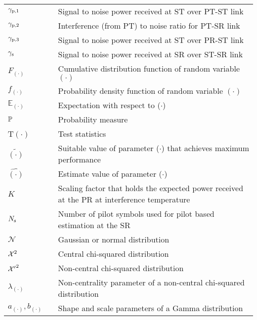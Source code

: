 \begin{longtable}{p{}p{}p{}}
	${\gamma}_{\text{p,1}}$  		& &		Signal to noise power received at ST over PT-ST link \\ 
        ${\gamma}_{\text{p,2}}$                & &             Interference (from PT) to noise ratio for PT-SR link \\
	${\gamma}_{\text{p,3}}$  		& &		Signal to noise power received at ST over PR-ST link \\ 
	${\gamma}_{\text{s}}$  		& &		Signal to noise power received at SR over ST-SR link \\ 
       $F_{(\cdot)}$            & &          Cumulative distribution function of random variable $(\cdot)$ \\
       $f_{(\cdot)}$            & &          Probability density function of random variable $(\cdot)$ \\
       $\mathbb E_{(\cdot)}$    & &		Expectation with respect to ($\cdot$) \\
       $\mathbb P$                     & &     	Probability measure \\
       T$(\cdot)$  	        & &          Test statistics \\
       $\tilde{(\cdot)}$        & &		Suitable value of parameter ($\cdot$) that achieves maximum performance \\
       $\hat{(\cdot)}$        & &		Estimate value of parameter ($\cdot$) \\
       $K$                      & &      Scaling factor that holds the expected power received at the PR at interference temperature  \\
       $N_{\text{s}}$                    & &      Number of pilot symbols used for pilot based estimation at the SR \\
       $\mathcal N$                & &      Gaussian or normal distribution\\
       $\cchi2 $                & &      Central chi-squared distribution \\
       $\ncchi2$                & &      Non-central chi-squared distribution \\
       $\lambda_{(\cdot)}$ &     &       Non-centrality parameter of a non-central chi-squared distribution \\
       $a_{(\cdot)}, b_{(\cdot)}$ &  &       Shape and scale parameters of a Gamma distribution \\


\end{longtable}
